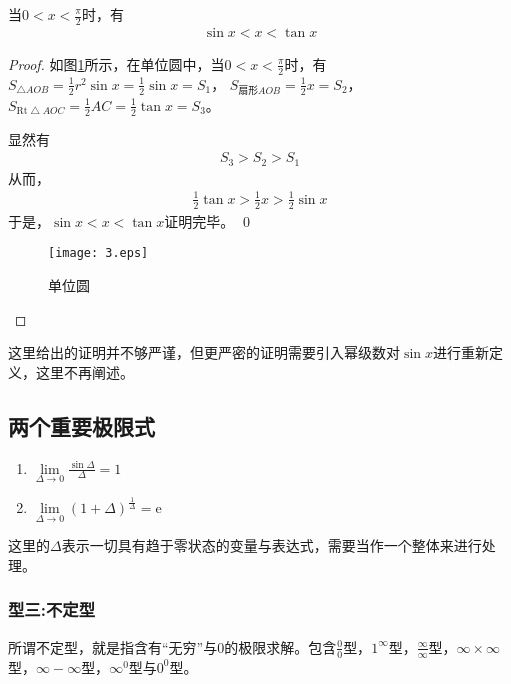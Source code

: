    当$ 0<x<\displaystyle\frac{\pi}{2} $时，有
    \begin{align*}
        \sin x<x<\tan x
    \end{align*}
        \begin{proof}
        如图\ref{dwy}所示，在单位圆中，当$ 0<x<\displaystyle\frac{\pi}{2}$时，有
        $S_{\bigtriangleup AOB}=\displaystyle\frac{1}{2}r^2 \sin x=\displaystyle\frac{1}{2}\sin x=S_1$， 
        $S_{\text{扇形} AOB}=\displaystyle\frac{1}{2}x=S_2$， 
        $S_{\mathrm{Rt} \bigtriangleup AOC}=\displaystyle\frac{1}{2}AC=\displaystyle\frac{1}{2}\tan x=S_3$。
        
        显然有
        \begin{align*}
            S_3>S_2>S_1
        \end{align*}
        从而，
        \begin{align*}
            \frac{1}{2}\tan x>\frac{1}{2}x>\frac{1}{2}\sin x
        \end{align*}
        于是，$\sin x<x<\tan x$证明完毕。 \qed
        \begin{figure}[htbp]
            \centering
            \texttt{[image: 3.eps]}
            \caption{单位圆}
            \label{dwy}
          \end{figure}
        \end{proof}
        \begin{note}
            这里给出的证明并不够严谨，但更严密的证明需要引入幂级数对$\sin x$进行重新定义，这里不再阐述。
        \end{note}
        
        \subsection{两个重要极限式}
        \begin{enumerate}
            \item $\lim\limits_{\Delta \to 0} \frac{\sin \Delta}{\Delta}=1$
            \item $\lim\limits_{\Delta \to 0} (1+\Delta)^{\frac{1}{\Delta}}=\mathrm{e}$
        \end{enumerate}
        \begin{note}
            这里的$\Delta$表示一切具有趋于零状态的变量与表达式，需要当作一个整体来进行处理。
        \end{note}

        \subsubsection*{型三:不定型}
        所谓不定型，就是指含有“无穷”与0的极限求解。包含$ 
        \frac{0}{0} $型，$ 1^{\infty} $型，$ 
        \frac{\infty}{\infty} $型，$ 
        \infty \times \infty $型，$ 
        \infty - \infty $型，$ 
        \infty^{0} $型与$0^{0} $型。

